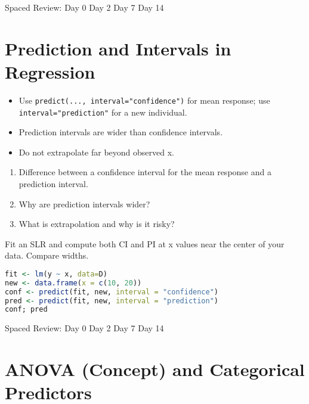 \documentclass[11pt,a4paper]{article}
\def\textbf#1{#1}%
\newcommand{\reviewticks}{
  \vspace{0.4em}
  \noindent\scriptsize\textbf{Spaced Review:}
  \fbox{\phantom{D0}} Day 0\quad
  \fbox{\phantom{D2}} Day 2\quad
  \fbox{\phantom{D7}} Day 7\quad
  \fbox{\phantom{D14}} Day 14
}
\begin{document}
\reviewticks

\section{Prediction and Intervals in Regression}

\begin{corebox}
\begin{itemize}
  \item Use \texttt{predict(..., interval="confidence")} for mean response; use \texttt{interval="prediction"} for a new individual.
  \item Prediction intervals are wider than confidence intervals.
  \item Do not extrapolate far beyond observed x.
\end{itemize}
\end{corebox}

\begin{recallbox}
\begin{enumerate}
  \item Difference between a confidence interval for the mean response and a prediction interval.
  \item Why are prediction intervals wider?
  \item What is extrapolation and why is it risky?
\end{enumerate}
\end{recallbox}

\begin{practicebox}
Fit an SLR and compute both CI and PI at x values near the center of your data. Compare widths.
\end{practicebox}

\begin{rbox}
\begin{lstlisting}[language=R]
fit <- lm(y ~ x, data=D)
new <- data.frame(x = c(10, 20))
conf <- predict(fit, new, interval = "confidence")
pred <- predict(fit, new, interval = "prediction")
conf; pred
\end{lstlisting}
\end{rbox}

\reviewticks

\section{ANOVA (Concept) and Categorical Predictors}
\end{document}
